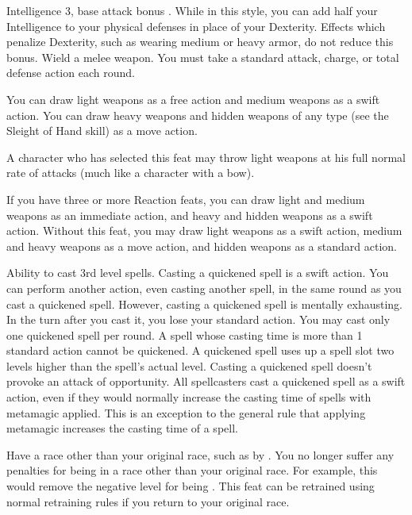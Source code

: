 \featpre Intelligence 3, base attack bonus .
\featben While in this style, you can add half your Intelligence to your physical defenses in place of your Dexterity. Effects which penalize Dexterity, such as wearing medium or heavy armor, do not reduce this bonus.
\stylereq Wield a melee weapon. You must take a standard attack, charge, or total defense action each round.

 You can draw light weapons as a free action and medium weapons as a swift action. You can draw heavy weapons and hidden weapons of any type (see the Sleight of Hand skill) as a move action.
\par A character who has selected this feat may throw light weapons at his full normal rate of attacks (much like a character with a bow).

If you have three or more Reaction feats, you can draw light and medium weapons as an immediate action, and heavy and hidden weapons as a swift action.
 Without this feat, you may draw light weapons as a swift action, medium and heavy weapons as a move action, and hidden weapons as a standard action.

\label{Quicken Spell}
 Ability to cast 3rd level spells.
 Casting a quickened spell is a swift action. You can perform another action, even casting another spell, in the same round as you cast a quickened spell. However, casting a quickened spell is mentally exhausting. In the turn after you cast it, you lose your standard action. You may cast only one quickened spell per round. A spell whose casting time is more than 1 standard action cannot be quickened. A quickened spell uses up a spell slot two levels higher than the spell's actual level. Casting a quickened spell doesn't provoke an attack of opportunity.
 All spellcasters cast a quickened spell as a swift action, even if they would normally increase the casting time of spells with metamagic applied. This is an exception to the general rule that applying metamagic increases the casting time of a spell.

\label{Racial Acclimation}
\featpre Have a race other than your original race, such as by .
\featben You no longer suffer any penalties for being in a race other than your original race. For example, this would remove the negative level for being .
 This feat can be retrained using normal retraining rules if you return to your original race.

